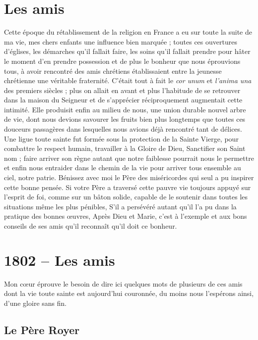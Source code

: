 \documentclass[11pt,a4paper]{report}
\begin{document}
\section*{Les amis}

Cette époque du rétablissement de la religion en France a eu sur toute la suite de ma vie, mes chers enfants une influence bien marquée ; toutes ces ouvertures d'églises, les démarches qu'il fallait faire, les soins qu'il fallait prendre pour hâter le moment d'en prendre possession et de plus le bonheur que nous éprouvions tous, à avoir rencontré des amis chrétiens établissaient entre la jeunesse chrétienne une véritable fraternité. C'était tout à fait le \textit{cor unum} et \textit{l'anima una} des premiers siècles ; plus on allait en avant et plus l'habitude de se retrouver dans la maison du Seigneur et de s'apprécier réciproquement augmentait cette intimité. Elle produisit enfin au milieu de nous, une union durable nouvel arbre de vie, dont nous devions savourer les fruits bien plus longtemps que toutes ces douceurs passagères dans lesquelles nous avions déjà rencontré tant de délices. Une ligue toute sainte fut formée sous la protection de la Sainte Vierge, pour combattre le respect humain, travailler à la Gloire de Dieu, Sanctifier son Saint nom ; faire arriver son règne autant que notre faiblesse pourrait nous le permettre et enfin nous entraider dans le chemin de la vie pour arriver tous ensemble au ciel, notre patrie. Bénissez avec moi le Père des miséricordes qui seul a pu inspirer cette bonne pensée. Si votre Père a traversé cette pauvre vie toujours appuyé sur l'esprit de foi, comme sur un bâton solide, capable de le soutenir dans toutes les situations même les plus pénibles, S'il a persévéré autant qu'il l'a pu dans la pratique des bonnes œuvres, Après Dieu et Marie, c'est à l'exemple et aux bons conseils de ses amis qu'il reconnaît qu'il doit ce bonheur.

\section*{1802 -- Les amis}

Mon cœur éprouve le besoin de dire ici quelques mots de plusieurs de ces amis dont la vie toute sainte est aujourd'hui couronnée, du moins nous l'espérons ainsi, d'une gloire sans fin.

\subsection*{Le Père Royer}
\end{document}
